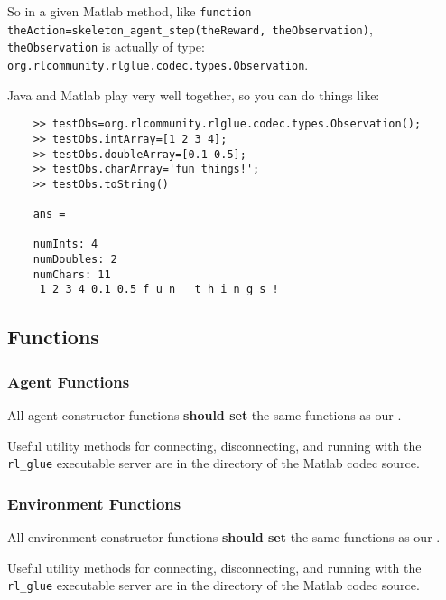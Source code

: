 \documentclass[11pt]{article}
\begin{document}
So in a given Matlab method, like \newline
\texttt{function theAction=skeleton\_agent\_step(theReward, theObservation)}, 
\texttt{theObservation} is actually of type: \texttt{org.rlcommunity.rlglue.codec.types.Observation}.

Java and Matlab play very well together, so you can do things like:
\begin{verbatim}
	>> testObs=org.rlcommunity.rlglue.codec.types.Observation();
	>> testObs.intArray=[1 2 3 4];
	>> testObs.doubleArray=[0.1 0.5];
	>> testObs.charArray='fun things!';
	>> testObs.toString()

	ans =

	numInts: 4
	numDoubles: 2
	numChars: 11
	 1 2 3 4 0.1 0.5 f u n   t h i n g s !
\end{verbatim}

\subsection{Functions}
\subsubsection{Agent Functions}
All agent constructor functions \textbf{should set} the same functions as our .

Useful utility methods for connecting, disconnecting, and running with the \texttt{rl\_glue} executable server are in the  directory of the Matlab codec source.

\subsubsection{Environment Functions}
All environment constructor functions \textbf{should set} the same functions as our .

Useful utility methods for connecting, disconnecting, and running with the \texttt{rl\_glue} executable server are in the  directory of the Matlab codec source.
\end{document}
